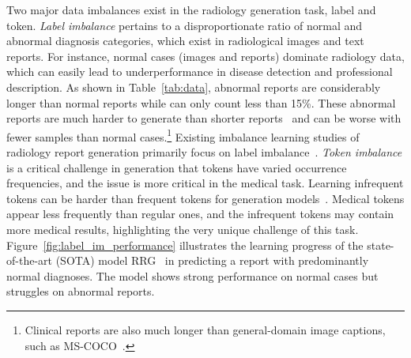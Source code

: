 \documentclass[sn-mathphys-num]{sn-jnl}%
\theoremstyle{thmstyleone}%
\theoremstyle{thmstyletwo}%
\theoremstyle{thmstylethree}%
\begin{document}
Two major data imbalances exist in the radiology generation task, label and token. 
\textit{Label imbalance} pertains to a disproportionate ratio of normal and abnormal diagnosis categories, which exist in radiological images and text reports.
For instance, normal cases (images and reports) dominate radiology data, which can easily lead to underperformance in disease detection and professional description.
As shown in Table~\ref{tab:data}, abnormal reports are considerably longer than normal reports while can only count less than 15\%. 
These abnormal reports are much harder to generate than shorter reports~\cite{lovelace2020learning, tan2021progressive, wang2023metransformer} and can be worse with fewer samples than normal cases.\footnote{Clinical reports are also much longer than general-domain image captions, such as MS-COCO~\cite{lin2014microsoft}.}
Existing imbalance learning studies of radiology report generation primarily focus on label imbalance~\cite{nishino2020reinforcement, yu2022clinically}.
\textit{Token imbalance} is a critical challenge in generation that tokens have varied occurrence frequencies, and the issue is more critical in the medical task.
Learning infrequent tokens can be harder than frequent tokens for generation models~\cite{gu2020token,wu2023token}.
Medical tokens appear less frequently than regular ones, and the infrequent tokens may contain more medical results, highlighting the very unique challenge of this task.
Figure~\ref{fig:label_im_performance} illustrates the learning progress of the state-of-the-art (SOTA) model RRG~\cite{delbrouck2022improving} in predicting a report with predominantly normal diagnoses.
The model shows strong performance on normal cases but struggles on abnormal reports.


\end{document}
